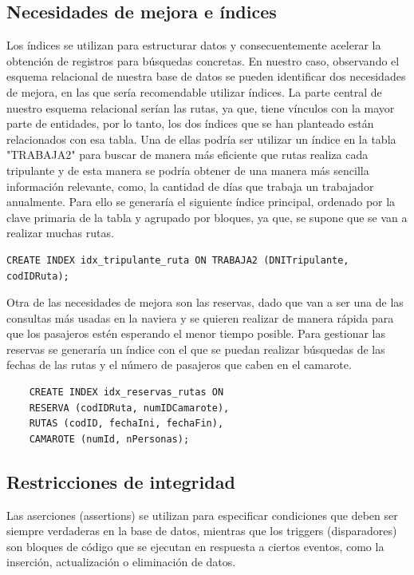 \documentclass{article}
\begin{document}
\subsection{Necesidades de mejora e índices}
Los índices se utilizan para estructurar datos y consecuentemente acelerar la obtención de registros para búsquedas concretas. En nuestro caso, observando el esquema relacional de nuestra base de datos se pueden identificar dos necesidades de mejora, en las que sería recomendable utilizar índices. La parte central de nuestro esquema relacional serían las rutas, ya que, tiene vínculos con la mayor parte de entidades, por lo tanto, los dos índices que se han planteado están relacionados con esa tabla. 
\newline
\newline
Una de ellas podría ser utilizar un índice en la tabla "TRABAJA2" para buscar de manera más eficiente que rutas realiza cada tripulante y de esta manera se podría obtener de una manera más sencilla información relevante, como, la cantidad de días que trabaja un trabajador anualmente. 
\newline
\newline
Para ello se generaría el siguiente índice principal, ordenado por la clave primaria de la tabla y agrupado por bloques, ya que, se supone que se van a realizar muchas rutas.
\begin{verbatim}
CREATE INDEX idx_tripulante_ruta ON TRABAJA2 (DNITripulante, codIDRuta);
\end{verbatim}
Otra de las necesidades de mejora son las reservas, dado que van a ser una de las consultas más usadas en la naviera y se quieren realizar de manera rápida para que los pasajeros estén esperando el menor tiempo posible.
\newline
\newline
Para gestionar las reservas se generaría un índice con el que se puedan realizar búsquedas de las fechas de las rutas y el número de pasajeros que caben en el camarote.
\begin{verbatim}
    CREATE INDEX idx_reservas_rutas ON 
    RESERVA (codIDRuta, numIDCamarote), 
    RUTAS (codID, fechaIni, fechaFin),
    CAMAROTE (numId, nPersonas);
\end{verbatim}
\clearpage

\subsection{Restricciones de integridad}

Las aserciones (assertions) se utilizan para especificar condiciones que deben ser siempre verdaderas en la base de datos, mientras que los triggers (disparadores) son bloques de código que se ejecutan en respuesta a ciertos eventos, como la inserción, actualización o eliminación de datos.\\
\end{document}
